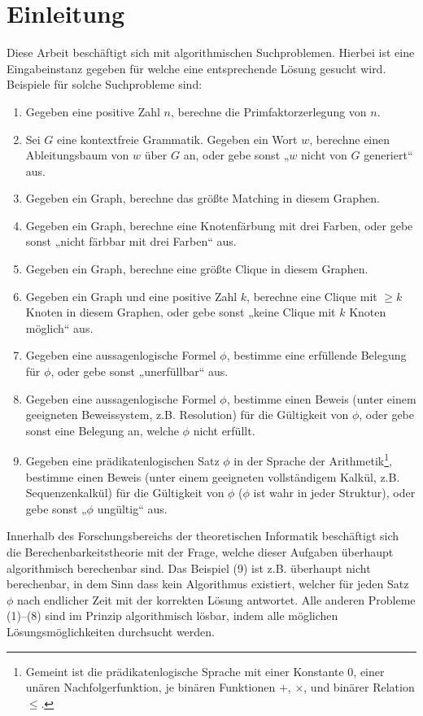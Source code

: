\chapter{Einleitung}

Diese Arbeit beschäftigt sich mit algorithmischen Suchproblemen. 
Hierbei ist eine Eingabeinstanz gegeben für welche eine entsprechende Lösung gesucht wird.
Beispiele für solche Suchprobleme sind:
\begin{enumerate}[label=\arabic*.,beginpenalty=0,midpenalty=0]
    \item Gegeben eine positive Zahl $n$, berechne die Primfaktorzerlegung von $n$.
    \item Sei $G$ eine kontextfreie Grammatik. Gegeben ein Wort $w$, berechne einen Ableitungsbaum von $w$ über $G$ an, oder gebe sonst „$w$ nicht von $G$ generiert“ aus.
    \item Gegeben ein Graph, berechne das größte Matching in diesem Graphen.
    \item Gegeben ein Graph, berechne eine Knotenfärbung mit drei Farben, oder gebe sonst „nicht färbbar mit drei Farben“ aus.
    \item Gegeben ein Graph, berechne eine größte Clique in diesem Graphen.
    \item Gegeben ein Graph und eine positive Zahl $k$, berechne eine Clique mit $\geq k$ Knoten in diesem Graphen, oder gebe sonst „keine Clique mit $k$ Knoten möglich“ aus.
    \item Gegeben eine aussagenlogische Formel $\phi$, bestimme eine erfüllende Belegung für $\phi$, oder gebe sonst „unerfüllbar“ aus.
    \item Gegeben eine aussagenlogische Formel $\phi$, bestimme einen Beweis (unter einem geeigneten Beweissystem, z.B. Resolution) für die Gültigkeit von $\phi$, oder gebe sonst eine Belegung an, welche $\phi$ nicht erfüllt.
    \item Gegeben eine prädikatenlogischen Satz $\phi$ in der Sprache der Arithmetik\footnote{Gemeint ist die prädikatenlogische Sprache mit einer Konstante $0$, einer unären Nachfolgerfunktion, je binären Funktionen $+$, $\times$, und binärer Relation $\leq$.}, bestimme einen Beweis (unter einem geeigneten vollständigem Kalkül, z.B. Sequenzenkalkül) für die Gültigkeit von $\phi$ ($\phi$ ist wahr in jeder Struktur), oder gebe sonst „$\phi$ ungültig“ aus.
\end{enumerate}
Innerhalb des Forschungsbereichs der theoretischen Informatik beschäftigt sich die Berechenbarkeitstheorie mit der Frage, welche dieser Aufgaben überhaupt algorithmisch berechenbar sind. Das Beispiel (9) ist z.B. überhaupt nicht berechenbar, in dem Sinn dass kein Algorithmus existiert, welcher für jeden Satz $\phi$ nach endlicher Zeit mit der korrekten Lösung antwortet.
Alle anderen Probleme (1)--(8) sind im Prinzip algorithmisch lösbar, indem alle möglichen Lösungsmöglichkeiten durchsucht werden.

